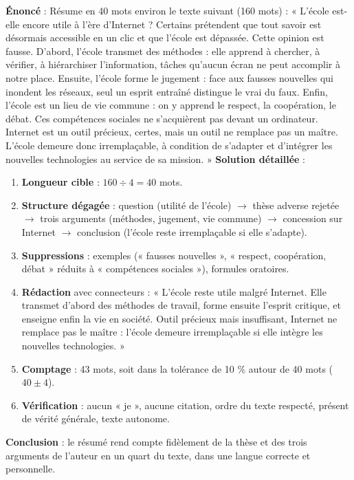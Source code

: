 \documentclass[11pt]{article}
\begin{document}
\begin{exoresolu}
\textbf{Énoncé} : Résume en 40 mots environ le texte suivant (160 mots) :
« L'école est-elle encore utile à l'ère d'Internet ? Certains prétendent que tout savoir est désormais accessible en un clic et que l'école est dépassée. Cette opinion est fausse. D'abord, l'école transmet des méthodes : elle apprend à chercher, à vérifier, à hiérarchiser l'information, tâches qu'aucun écran ne peut accomplir à notre place. Ensuite, l'école forme le jugement : face aux fausses nouvelles qui inondent les réseaux, seul un esprit entraîné distingue le vrai du faux. Enfin, l'école est un lieu de vie commune : on y apprend le respect, la coopération, le débat. Ces compétences sociales ne s'acquièrent pas devant un ordinateur. Internet est un outil précieux, certes, mais un outil ne remplace pas un maître. L'école demeure donc irremplaçable, à condition de s'adapter et d'intégrer les nouvelles technologies au service de sa mission. »
\tcblower
\textbf{Solution détaillée} :
\begin{enumerate}
\item \textbf{Longueur cible} : $160 \div 4 = 40$ mots.
\item \textbf{Structure dégagée} : question (utilité de l'école) $\rightarrow$ thèse adverse rejetée $\rightarrow$ trois arguments (méthodes, jugement, vie commune) $\rightarrow$ concession sur Internet $\rightarrow$ conclusion (l'école reste irremplaçable si elle s'adapte).
\item \textbf{Suppressions} : exemples (« fausses nouvelles », « respect, coopération, débat » réduits à « compétences sociales »), formules oratoires.
\item \textbf{Rédaction} avec connecteurs :
« L'école reste utile malgré Internet. Elle transmet d'abord des méthodes de travail, forme ensuite l'esprit critique, et enseigne enfin la vie en société. Outil précieux mais insuffisant, Internet ne remplace pas le maître : l'école demeure irremplaçable si elle intègre les nouvelles technologies. »
\item \textbf{Comptage} : 43 mots, soit dans la tolérance de 10 \% autour de 40 mots ($40 \pm 4$).
\item \textbf{Vérification} : aucun « je », aucune citation, ordre du texte respecté, présent de vérité générale, texte autonome.
\end{enumerate}
\textbf{Conclusion} : le résumé rend compte fidèlement de la thèse et des trois arguments de l'auteur en un quart du texte, dans une langue correcte et personnelle.
\end{exoresolu}
\end{document}
